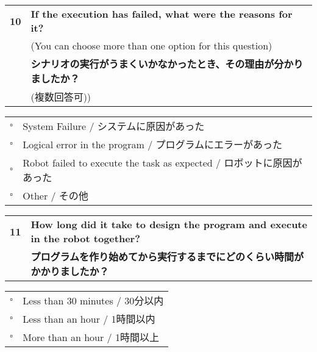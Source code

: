 \begin{Form}

\vspace{.05in}
\begin{tabular}{rl}
\textbf{10} & \textbf{If the execution has failed, what were the reasons for it?}\\
{} & (You can choose more than one option for this question)\\
{} & \textbf{シナリオの実行がうまくいかなかったとき、その理由が分かりましたか？}\\
{} & (複数回答可))\\
\end{tabular}

\begin{tabular}{rl}
\quad $\square$ & System Failure / システムに原因があった \\
\quad $\square$ & Logical error in the program / プログラムにエラーがあった \\
\quad $\square$ & Robot failed to execute the task as expected / ロボットに原因があった \\
\quad $\square$ & Other / その他 \\
\end{tabular}
\begin{tabular}{rl}
\textbf{11} & \textbf{How long did it take to design the program and execute in the robot together?}\\
{} & \textbf{プログラムを作り始めてから実行するまでにどのくらい時間がかかりましたか？}\\
\end{tabular}

\begin{tabular}{rl}
\quad $\square$ & Less than 30 minutes / 30分以内 \\
\quad $\square$ & Less than an hour / 1時間以内 \\
\quad $\square$ & More than an hour / 1時間以上 \\
\end{tabular}
\vspace{.1in}



\end{Form}
